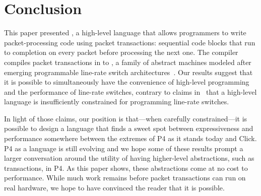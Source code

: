 \section{Conclusion}
\label{s:conclusion}

This paper presented \pktlanguage, a high-level language that allows
programmers to write packet-processing code using packet transactions:
sequential code blocks that run to completion on every packet before processing
the next one. The \pktlanguage compiler compiles packet transactions in
\pktlanguage to \absmachine, a family of abstract machines modeled after
emerging programmable line-rate switch architectures~\cite{flexpipe, xpliant,
rmt}. Our results suggest that it is possible to simultaneously have the
convenience of high-level programming and the performance of line-rate
switches, contrary to claims in~\cite{p4} that a high-level language is
insufficiently constrained for programming line-rate switches.

In light of those claims, our position is that---when carefully
constrained---it is possible to design a language that finds a sweet spot
between expressiveness and performance somewhere between the extremes of P4 as
it stands today and Click. P4 as a language is still evolving and we hope some
of these results prompt a larger conversation around the utility of having
higher-level abstractions, such as transactions, in P4. As this paper shows,
these abstractions come at no cost to performance. While much work remains
before packet transactions can run on real hardware, we hope to have convinced
the reader that it is possible.
